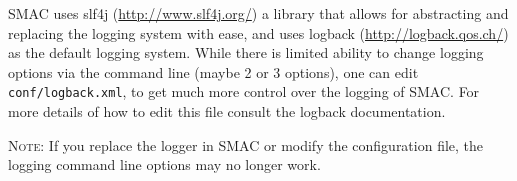 	SMAC uses slf4j (\url{http://www.slf4j.org/}) a library that allows for abstracting and replacing the logging system with ease, and uses logback (\url{http://logback.qos.ch/}) as the default logging system. While there is limited ability to change logging options via the command line (maybe 2 or 3 options), one can edit \texttt{conf/logback.xml}, to get much more control over the logging of SMAC. For more details of how to edit this file consult the logback documentation. 
	
	\textsc{Note:} If you replace the logger in SMAC or modify the configuration file, the logging command line options may no longer work.